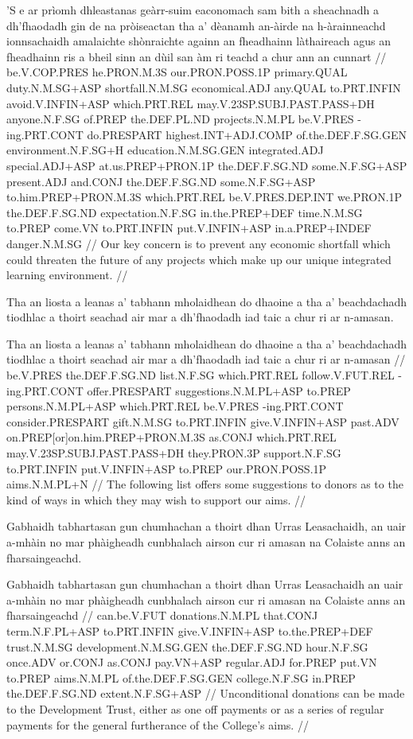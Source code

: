 \documentclass[a4paper,10pt]{article}
\begin{document}
\vspace{4mm}
\gla 'S e ar prìomh dhleastanas geàrr-suim eaconomach {sam bith} a sheachnadh a dh'fhaodadh gin de na pròiseactan tha a' dèanamh an-àirde na h-àrainneachd ionnsachaidh amalaichte shònraichte againn an fheadhainn làthaireach agus an fheadhainn ris a bheil sinn an dùil san àm ri teachd a chur {ann an} cunnart  //
\glb be.V.COP.PRES he.PRON.M.3S our.PRON.POSS.1P primary.QUAL duty.N.M.SG+ASP shortfall.N.M.SG economical.ADJ any.QUAL to.PRT.INFIN avoid.V.INFIN+ASP which.PRT.REL may.V.23SP.SUBJ.PAST.PASS+DH anyone.N.F.SG of.PREP the.DEF.PL.ND projects.N.M.PL be.V.PRES -ing.PRT.CONT do.PRESPART highest.INT+ADJ.COMP of.the.DEF.F.SG.GEN environment.N.F.SG+H education.N.M.SG.GEN integrated.ADJ special.ADJ+ASP at.us.PREP+PRON.1P the.DEF.F.SG.ND some.N.F.SG+ASP present.ADJ and.CONJ the.DEF.F.SG.ND some.N.F.SG+ASP to.him.PREP+PRON.M.3S which.PRT.REL be.V.PRES.DEP.INT we.PRON.1P the.DEF.F.SG.ND expectation.N.F.SG in.the.PREP+DEF time.N.M.SG to.PREP come.VN to.PRT.INFIN put.V.INFIN+ASP in.a.PREP+INDEF danger.N.M.SG  //
\glft Our key concern is to prevent any economic shortfall which could threaten the future of any projects which make up our unique integrated learning environment. //
\endgl
\xe

\ex
\begingl
\glpre Tha an liosta a leanas a' tabhann mholaidhean do dhaoine a tha a' beachdachadh tiodhlac a thoirt seachad air mar a dh'fhaodadh iad taic a chur ri ar n-amasan. 

\vspace{4mm}
\gla Tha an liosta a leanas a' tabhann mholaidhean do dhaoine a tha a' beachdachadh tiodhlac a thoirt seachad air mar a dh'fhaodadh iad taic a chur ri ar n-amasan  //
\glb be.V.PRES the.DEF.F.SG.ND list.N.F.SG which.PRT.REL follow.V.FUT.REL -ing.PRT.CONT offer.PRESPART suggestions.N.M.PL+ASP to.PREP persons.N.M.PL+ASP which.PRT.REL be.V.PRES -ing.PRT.CONT consider.PRESPART gift.N.M.SG to.PRT.INFIN give.V.INFIN+ASP past.ADV on.PREP[or]on.him.PREP+PRON.M.3S as.CONJ which.PRT.REL may.V.23SP.SUBJ.PAST.PASS+DH they.PRON.3P support.N.F.SG to.PRT.INFIN put.V.INFIN+ASP to.PREP our.PRON.POSS.1P aims.N.M.PL+N  //
\glft The following list offers some suggestions to donors as to the kind of ways in which they may wish to support our aims. //
\endgl
\xe

\ex
\begingl
\glpre Gabhaidh tabhartasan gun chumhachan a thoirt dhan Urras Leasachaidh, an uair a-mhàin no mar phàigheadh cunbhalach airson cur ri amasan na Colaiste anns an fharsaingeachd. 

\vspace{4mm}
\gla Gabhaidh tabhartasan gun chumhachan a thoirt dhan Urras Leasachaidh an uair a-mhàin no mar phàigheadh cunbhalach airson cur ri amasan na Colaiste anns an fharsaingeachd  //
\glb can.be.V.FUT donations.N.M.PL that.CONJ term.N.F.PL+ASP to.PRT.INFIN give.V.INFIN+ASP to.the.PREP+DEF trust.N.M.SG development.N.M.SG.GEN the.DEF.F.SG.ND hour.N.F.SG once.ADV or.CONJ as.CONJ pay.VN+ASP regular.ADJ for.PREP put.VN to.PREP aims.N.M.PL of.the.DEF.F.SG.GEN college.N.F.SG in.PREP the.DEF.F.SG.ND extent.N.F.SG+ASP  //
\glft Unconditional donations can be made to the Development Trust, either as one off payments or as a series of regular payments for the general furtherance of the College's aims. //
\endgl
\xe
\end{document}
